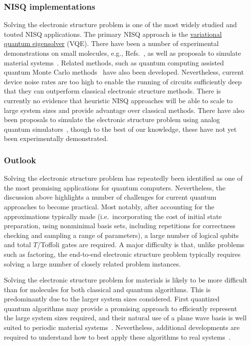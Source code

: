\begin{refsection}
\subsubsection*{NISQ implementations}
Solving the electronic structure problem is one of the most widely studied and touted NISQ applications. The primary NISQ approach is the \hyperref[prim:VQA]{variational quantum eigensolver} (VQE). There have been a number of experimental demonstrations on small molecules, e.g., Refs.~\cite{kandala2017VQE,google2020HartreeFockVQE}, as well as proposals to simulate material systems~\cite{yoshioka2022MaterialsVQE,manrique2020VQEmaterials2}. Related methods, such as quantum computing assisted quantum Monte Carlo methods~\cite{huggins2022QuantumQMC} have also been developed. Nevertheless, current device noise rates are too high to enable the running of circuits sufficiently deep that they can outperform classical electronic structure methods. There is currently no evidence that heuristic NISQ approaches will be able to scale to large system sizes and provide advantage over classical methods. There have also been proposals to simulate the electronic structure problem using analog quantum simulators~\cite{arguello2019AnalogChemistry}, though to the best of our knowledge, these have not yet been experimentally demonstrated.  



\subsubsection*{Outlook}
Solving the electronic structure problem has repeatedly been identified as one of the most promising applications for quantum computers. Nevertheless, the discussion above highlights a number of challenges for current quantum approaches to become practical. Most notably, after accounting for the approximations typically made (i.e.~incorporating the cost of initial state preparation, using nonminimal basis sets, including repetitions for correctness checking and sampling a range of parameters), a large number of logical qubits and total $T$/Toffoli gates are required. A major difficulty is that, unlike problems such as factoring, the end-to-end electronic structure problem typically requires solving a large number of closely related problem instances.

Solving the electronic structure problem for materials is likely to be more difficult than for molecules for both classical and quantum algorithms. This is predominantly due to the larger system sizes considered. First quantized quantum algorithms may provide a promising approach to efficiently represent the large system sizes required, and their natural use of a plane wave basis is well suited to periodic material systems~\cite{su2021FaultTolerantChemistryFirstQuantized}. Nevertheless, additional developments are required to understand how to best apply these algorithms to real systems~\cite{shokrianZini2023BatteryMaterials}.


\printbibliography[heading=secbib,segment=\therefsegment]
\end{refsection}








